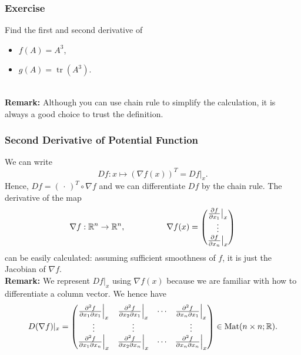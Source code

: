\documentclass[10pt, t, allowdisplaybreaks]{beamer}
\newcommand{\nullspace}{~\\[15pt]}
\begin{document}
\begin{frame}
    \frametitle{Exercise}
    Find the first and second derivative of
    \begin{itemize}
        \item $f(A)=A^3$,
        \item $g(A)=\operatorname{tr}(A^3)$.
    \end{itemize}
    \nullspace
    \textbf{Remark:} Although you can use chain rule to simplify the calculation, it is always a good choice to trust the definition.
\end{frame}

\begin{frame}[allowframebreaks]
    \frametitle{Second Derivative of Potential Function}
    We can write
    \[Df:x\mapsto(\nabla f(x))^T=Df|_x.\]
    Hence, $Df=(\,\cdot\,)^T\circ\nabla f$ and we can dif{}ferentiate $Df$ by the chain rule. The derivative of the map
    \[\nabla f:\mathbb{R}^n\to\mathbb{R}^n,\qquad\qquad\quad
        \nabla f(x)=\begin{pmatrix}
            \frac{\partial f}{\partial x_1}\big|_x \\
            \vdots                                 \\
            \frac{\partial f}{\partial x_n}\big|_x
        \end{pmatrix}\]
    \vspace*{-1pt}
    can be easily calculated: assuming suf{}ficient smoothness of $f$, it is just the Jacobian of $\nabla f$.
    \nullspace
    \textbf{Remark:} We represent $Df|_x$ using $\nabla f(x)$ because we are familiar with how to differentiate a column vector.
    \newpage
    We hence have
    \begin{equation}\label{2.5.2}
        D(\nabla f)|_x=\begin{pmatrix}
            \frac{\partial^2 f}{\partial x_1\partial x_1}\Big|_x & \frac{\partial^2 f}{\partial x_2\partial x_1}\Big|_x & \cdots & \frac{\partial^2 f}{\partial x_n\partial x_1}\Big|_x \\
            \vdots                                               & \vdots                                               &        & \vdots                                               \\
            \frac{\partial^2 f}{\partial x_1\partial x_n}\Big|_x & \frac{\partial^2 f}{\partial x_2\partial x_n}\Big|_x & \cdots & \frac{\partial^2 f}{\partial x_n\partial x_n}\Big|_x
        \end{pmatrix}\in\text{Mat}(n\times n;\mathbb{R}).
    \end{equation}

\end{frame}
\end{document}
